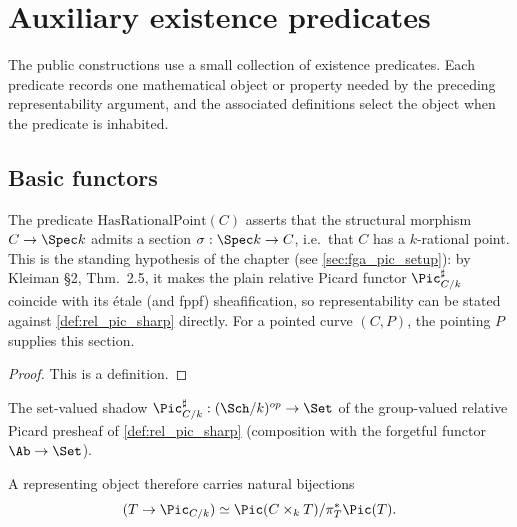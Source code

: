 \section{Auxiliary existence predicates}
\label{sec:fga_pic_typeclass_scaffolding}

The public constructions use a small collection of existence predicates. Each
predicate records one mathematical object or property needed by the preceding
representability argument, and the associated definitions select the object
when the predicate is inhabited.

\subsection{Basic functors}
\label{subsec:fga_pic_functor_carriers}

\begin{definition}\leanok
  \label{def:has_rational_point}
  The predicate \(\mathrm{HasRationalPoint}(C)\) asserts that the structural
  morphism \(C \to \Spec k\) admits a section
  \(\sigma : \Spec k \to C\), i.e.\ that \(C\) has a \(k\)-rational point.
  This is the standing hypothesis of the chapter (see
  \cref{sec:fga_pic_setup}): by Kleiman \S 2, Thm.~2.5, it makes the plain
  relative Picard functor \(\Pic^\sharp_{C/k}\) coincide with its \'etale
  (and fppf) sheafification, so representability can be stated against
  \cref{def:rel_pic_sharp} directly. For a pointed curve \((C,P)\), the
  pointing \(P\) supplies this section.
\end{definition}

\begin{proof}\leanok
  This is a definition.
\end{proof}

\begin{definition}\leanok
  \label{def:pic_sharp_carrier}
  The set-valued shadow \(\Pic^\sharp_{C/k} : (\Sch/k)^{op} \to \Set\) of the
  group-valued relative Picard presheaf of \cref{def:rel_pic_sharp}
  (composition with the forgetful functor \(\Ab \to \Set\)).

  A representing object therefore carries natural bijections
  \[
    (T \to \Pic_{C/k}) \simeq
    \Pic(C \times_k T)/\pi_T^*\Pic(T).
  \]
\end{definition}

